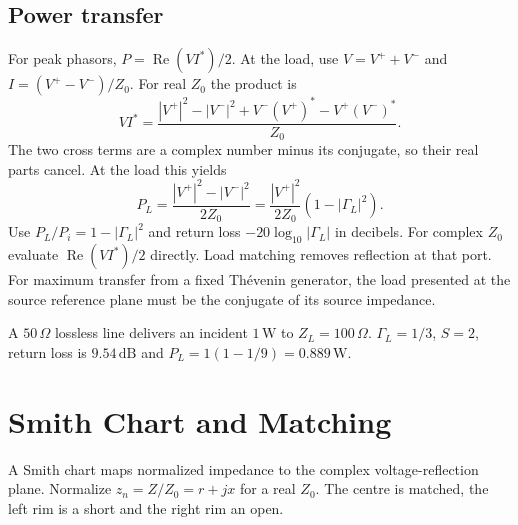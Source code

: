 \documentclass[12pt,a4paper]{article}
\begin{document}
\subsection{Power transfer}
For peak phasors, $P=\operatorname{Re}(VI^*)/2$. At the load, use $V=V^++V^-$ and $I=(V^+-V^-)/Z_0$. For real $Z_0$ the product is
\[
 VI^*=\frac{|V^+|^2-|V^-|^2+
           V^-(V^+)^*-V^+(V^-)^*}{Z_0}.
\]
The two cross terms are a complex number minus its conjugate, so their real parts cancel. At the load this yields
\[
 P_L=\frac{|V^+|^2-|V^-|^2}{2Z_0}
 =\frac{|V^+|^2}{2Z_0}(1-|\Gamma_L|^2).
\]
Use $P_L/P_i=1-|\Gamma_L|^2$ and return loss $-20\log_{10}|\Gamma_L|$ in decibels. For complex $Z_0$ evaluate $\operatorname{Re}(VI^*)/2$ directly. Load matching removes reflection at that port. For maximum transfer from a fixed Thévenin generator, the load presented at the source reference plane must be the conjugate of its source impedance.
\begin{tcolorbox}[examplebox,title={Return loss, VSWR and delivered power}]
A $50\,\Omega$ lossless line delivers an incident $1\,\mathrm W$ to $Z_L=100\,\Omega$. $\Gamma_L=1/3$, $S=2$, return loss is $9.54\,\mathrm{dB}$ and $P_L=1(1-1/9)=0.889\,\mathrm W$.
\end{tcolorbox}

\section{Smith Chart and Matching}
\begin{tcolorbox}[defbox,title={Smith chart}]
A Smith chart maps normalized impedance to the complex voltage-reflection plane. Normalize $z_n=Z/Z_0=r+jx$ for a real $Z_0$. The centre is matched, the left rim is a short and the right rim an open.
\end{tcolorbox}
\end{document}
